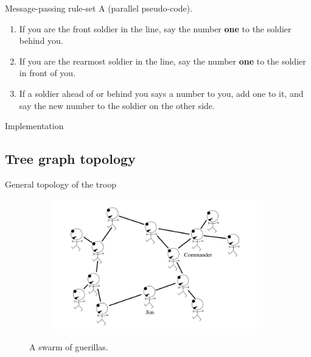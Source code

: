\documentclass[pdflatex,colorlinks,landscape]{beamer}
\begin{document}
\begin{frame}{Message-passing rule-set A (parallel pseudo-code).}
  \begin{enumerate}
  \item If you are the front soldier in the line, say the number \textbf{one} to the
    soldier behind you.
  \item If you are the rearmost soldier in the line, say the number \textbf{one} to
    the soldier in front of you.
  \item If a soldier ahead of or behind you says a number to you, add one
    to it, and say the new number to the soldier on the other side.
  \end{enumerate}
\end{frame}

\begin{frame}[allowframebreaks]{Implementation}
  \begin{small}
    
  \end{small}
\end{frame}

\subsection{Tree graph topology}

\begin{frame}{General topology of the troop}
  \begin{figure}[H]
    \begin{figure}
      \includegraphics[width=\textwidth]{SwarmOfGuerillas.png}
    \end{figure}
    \caption{A swarm of guerillas.}
  \end{figure}
\end{frame}
\end{document}

